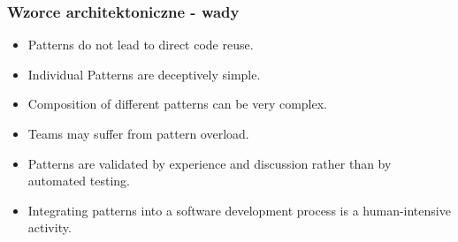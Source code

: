 \documentclass[../main.tex]{subfiles}
\begin{document}
    \subsubsection{Wzorce architektoniczne - wady}
    \begin{itemize}
        \item Patterns do not lead to direct code reuse.
        \item Individual Patterns are deceptively simple.
        \item Composition of different patterns can be very complex.
        \item Teams may suffer from pattern overload.
        \item Patterns are validated by experience and discussion
        rather than by automated testing.
        \item Integrating patterns into a software development
        process is a human-intensive activity.
    \end{itemize}
\end{document}
